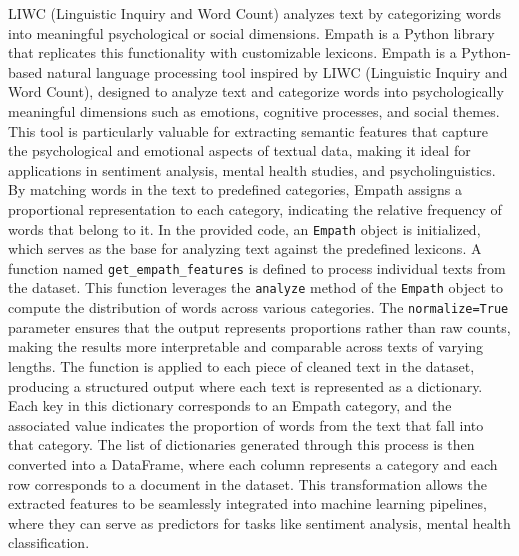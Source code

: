 \noindent
LIWC (Linguistic Inquiry and Word Count) analyzes text by categorizing words into meaningful psychological or social dimensions. Empath is a Python library that replicates this functionality with customizable lexicons. Empath is a Python-based natural language processing tool inspired by LIWC (Linguistic Inquiry and Word Count), designed to analyze text and categorize words into psychologically meaningful dimensions such as emotions, cognitive processes, and social themes. This tool is particularly valuable for extracting semantic features that capture the psychological and emotional aspects of textual data, making it ideal for applications in sentiment analysis, mental health studies, and psycholinguistics. By matching words in the text to predefined categories, Empath assigns a proportional representation to each category, indicating the relative frequency of words that belong to it. In the provided code, an \texttt{Empath} object is initialized, which serves as the base for analyzing text against the predefined lexicons. A function named \texttt{get\_empath\_features} is defined to process individual texts from the dataset. This function leverages the \texttt{analyze} method of the \texttt{Empath} object to compute the distribution of words across various categories. The \texttt{normalize=True} parameter ensures that the output represents proportions rather than raw counts, making the results more interpretable and comparable across texts of varying lengths. The function is applied to each piece of cleaned text in the dataset, producing a structured output where each text is represented as a dictionary. Each key in this dictionary corresponds to an Empath category, and the associated value indicates the proportion of words from the text that fall into that category. The list of dictionaries generated through this process is then converted into a DataFrame, where each column represents a category and each row corresponds to a document in the dataset. This transformation allows the extracted features to be seamlessly integrated into machine learning pipelines, where they can serve as predictors for tasks like sentiment analysis, mental health classification.

